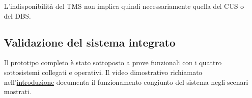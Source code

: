 L'indisponibilità del TMS non implica quindi necessariamente quella del CUS o del DBS.

\subsection{Validazione del sistema integrato}

Il prototipo completo è stato sottoposto a prove funzionali con i quattro sottosistemi collegati e operativi.
Il video dimostrativo richiamato nell'\hyperref[sec:introduction]{introduzione} documenta il funzionamento congiunto del sistema negli scenari mostrati.

